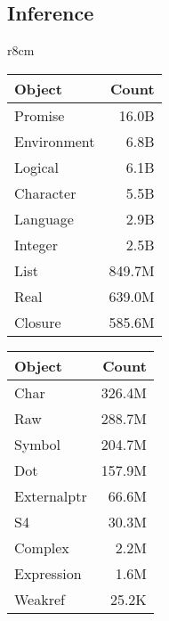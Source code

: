 \documentclass[review,nonacm,screen,acmsmall,anonymous=true]{acmart}
\begin{document}
\subsection{Inference}

\begin{wraptable}{r}{8cm}
  \vspace{-3mm}
  \small
  \caption{Allocations} \label{table:allocations}
  \centering
  \begin{tabular}{lr}
    \toprule
    \bf Object&\bf Count\\
    \midrule
    Promise&16.0B\\
    Environment&6.8B\\
    Logical&6.1B\\
    Character&5.5B\\
    Language&2.9B\\
    Integer&2.5B\\
    List&849.7M\\
    Real&639.0M\\
    Closure&585.6M\\
    \bottomrule
  \end{tabular}
  \begin{tabular}{lr}
    \toprule
    \bf Object&\bf Count\\
    \midrule
    Char&326.4M\\
    Raw&288.7M\\
    Symbol&204.7M\\
    Dot&157.9M\\
    Externalptr&66.6M\\
    S4&30.3M\\
    Complex&2.2M\\
    Expression&1.6M\\
    Weakref&25.2K\\
    \bottomrule
  \end{tabular}
\end{wraptable}
\end{document}
